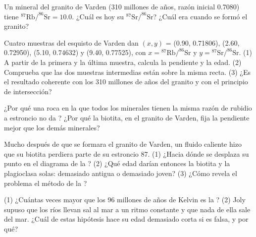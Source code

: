 \begin{exercise}[$\star\star$]\label{exo:g12:age-of-the-earth:6}
Un mineral del granito de Varden (310 millones de años, razón inicial 0.7080)
tiene $^{87}\mathrm{Rb}/^{86}\mathrm{Sr} = 10.0$. ¿Cuál es hoy su
$^{87}\mathrm{Sr}/^{86}\mathrm{Sr}$? ¿Cuál era cuando se formó el granito?
\end{exercise}

\begin{exercise}[$\star\star$]\label{exo:g12:age-of-the-earth:7}
Cuatro muestras del esquisto de Varden dan $(x, y)$ = (0.90, 0.71806),
(2.60, 0.72950), (5.10, 0.74632) y (9.40, 0.77525), con $x =
{}^{87}\mathrm{Rb}/^{86}\mathrm{Sr}$ y $y = {}^{87}\mathrm{Sr}/^{86}\mathrm{Sr}$.
(1) A partir de la primera y la última muestra, calcula la pendiente y la
edad. (2) Comprueba que las dos muestras intermedias están sobre la misma
recta. (3) ¿Es el resultado coherente con los 310 millones de años del
granito y con el principio de intersección?
\end{exercise}

\begin{exercise}[$\star\star$]\label{exo:g12:age-of-the-earth:8}
¿Por qué una roca en la que todos los minerales tienen la misma razón de
rubidio a estroncio no da ? ¿Por qué la biotita, en el granito de
Varden, fija la pendiente mejor que los demás minerales?
\end{exercise}

\begin{exercise}[$\star\star$]\label{exo:g12:age-of-the-earth:9}
Mucho después de que se formara el granito de Varden, un fluido caliente hizo
que su biotita perdiera parte de su estroncio 87. (1) ¿Hacia dónde se desplaza
su punto en el diagrama de la ? (2) ¿Qué edad darían entonces la
biotita y la plagioclasa solas: demasiado antigua o demasiado joven? (3) ¿Cómo
revela el problema el método de la ?
\end{exercise}

\begin{exercise}[$\star\star$]\label{exo:g12:age-of-the-earth:10}
(1) ¿Cuántas veces mayor que los 96 millones de años de Kelvin es la ? (2) Joly supuso que los ríos llevan sal al mar a un ritmo constante
y que nada de ella sale del mar. ¿Cuál de estas hipótesis hace su edad
demasiado corta si es falsa, y por qué?
\end{exercise}

